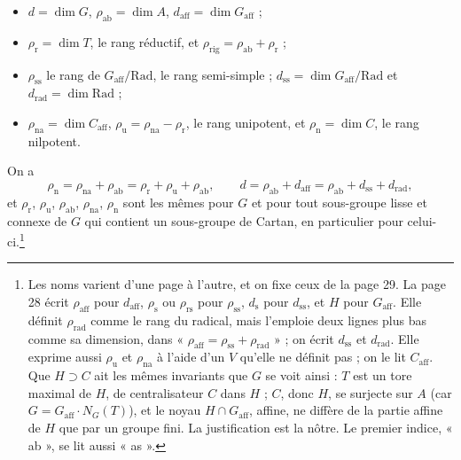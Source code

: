 \documentclass[11pt,a4paper]{article}
\begin{document}
\begin{itemize}
\item $d = \dim G$, $\rho_{\mathrm{ab}} = \dim A$,
$d_{\mathrm{aff}} = \dim G_{\mathrm{aff}}$ ;
\item $\rho_{\mathrm{r}} = \dim T$, le rang réductif, et
$\rho_{\mathrm{rig}} = \rho_{\mathrm{ab}} + \rho_{\mathrm{r}}$ ;
\item $\rho_{\mathrm{ss}}$ le rang de $G_{\mathrm{aff}}/\mathrm{Rad}$, le rang
semi-simple ; $d_{\mathrm{ss}} = \dim G_{\mathrm{aff}}/\mathrm{Rad}$ et
$d_{\mathrm{rad}} = \dim \mathrm{Rad}$ ;
\item $\rho_{\mathrm{na}} = \dim C_{\mathrm{aff}}$,
$\rho_{\mathrm{u}} = \rho_{\mathrm{na}} - \rho_{\mathrm{r}}$, le rang
unipotent, et $\rho_{\mathrm{n}} = \dim C$, le rang nilpotent.
\end{itemize}

On a
\[
  \rho_{\mathrm{n}} = \rho_{\mathrm{na}} + \rho_{\mathrm{ab}} =
  \rho_{\mathrm{r}} + \rho_{\mathrm{u}} + \rho_{\mathrm{ab}}, \qquad
  d = \rho_{\mathrm{ab}} + d_{\mathrm{aff}} = \rho_{\mathrm{ab}} +
  d_{\mathrm{ss}} + d_{\mathrm{rad}} ,
\]
et $\rho_{\mathrm{r}}$, $\rho_{\mathrm{u}}$, $\rho_{\mathrm{ab}}$,
$\rho_{\mathrm{na}}$, $\rho_{\mathrm{n}}$ sont les mêmes pour $G$ et pour
tout sous-groupe lisse et connexe de $G$ qui contient un sous-groupe de
Cartan, en particulier pour celui-ci.\footnote{Les noms varient d'une page à l'autre, et on
fixe ceux de la page 29. La page 28 écrit $\rho_{\mathrm{aff}}$ pour
$d_{\mathrm{aff}}$, $\rho_{\mathrm{s}}$ ou $\rho_{\mathrm{rs}}$ pour
$\rho_{\mathrm{ss}}$, $d_{\mathrm{s}}$ pour $d_{\mathrm{ss}}$, et
$H$ pour $G_{\mathrm{aff}}$. Elle définit $\rho_{\mathrm{rad}}$ comme le rang
du radical, mais l'emploie deux lignes plus bas comme sa dimension, dans
« $\rho_{\mathrm{aff}} = \rho_{\mathrm{ss}} + \rho_{\mathrm{rad}}$ » ; on
écrit $d_{\mathrm{ss}}$ et $d_{\mathrm{rad}}$. Elle exprime aussi
$\rho_{\mathrm{u}}$ et $\rho_{\mathrm{na}}$ à l'aide d'un $V$ qu'elle ne
définit pas ; on le lit $C_{\mathrm{aff}}$. Que $H \supset C$ ait les mêmes
invariants que $G$ se voit ainsi : $T$ est un tore maximal de $H$, de
centralisateur $C$ dans $H$ ; $C$, donc $H$, se surjecte sur $A$ (car
$G = G_{\mathrm{aff}} \cdot N_{G}(T)$), et le noyau $H \cap G_{\mathrm{aff}}$,
affine, ne diffère de la partie affine de $H$ que par un groupe fini. La
justification est la nôtre. Le premier indice, « ab », se lit aussi « as ».}
\end{document}
